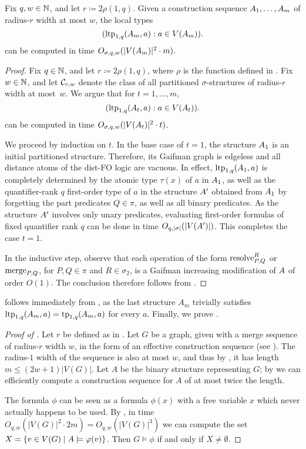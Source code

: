 \begin{lemma}\label{lem:compute}Fix $q,w\in\N$, and let $r\coloneqq 2\rho(1,q)$.
 Given a  construction sequence  $\str A_1,\ldots,\str A_m$
 of radius-$r$ width at most $w$, the local types 
   $$(\ltp_{1,q}(\str A_m,a):a\in V(\str A_m)).$$
 can be computed in time 
 $O_{\sigma,q,w}(|V(\str A_m)|^2 \cdot m)$.
\end{lemma}
\begin{proof}
  Fix $q\in\N$,
and let $r\coloneqq 2\rho(1,q)$, where $\rho$ is the function defined in .
Fix $w\in\N$, and let $\CC_{r,w}$ denote the class of all partitioned $\sigma$-structures 
of radius-$r$ width at most~$w$.
We argue that for $t=1,\ldots,m$,
$$(\ltp_{1,q}(\str A_t,a):a\in V(\str A_t)).$$
can be computed in time 
$O_{\sigma,q,w}(|V(\str A_t)|^2\cdot t)$.

We proceed by induction on $t$.
In the base case of $t=1$, the structure $\str A_1$ is an initial partitioned structure.
  Therefore, its Gaifman graph is edgeless and all distance atoms of the dist-FO logic are vacuous.
  In effect, $\ltp_{1,q}(\str A_1,a)$ is completely determined by the 
  atomic type $\tau(x)$ of $a$ in $\str A_1$,
as well as the  quantifier-rank $q$ first-order type of $a$ in the structure $\str A'$ obtained from $\str A_1$ by forgetting the part predicates $Q\in\pi$, as well as all binary predicates. As the structure $\str A'$ involves only unary predicates, 
evaluating first-order formulas of fixed quantifier rank $q$ can be done in time $O_{q,|\sigma|}(|V(\str A')|)$.
This completes the case $t=1$.

In the inductive step,
observe 
that 
each operation of the form 
$\resolve RPQ$ or $\merge PQ$, for $P,Q\in \pi$ and $R\in\sigma_2$,
is a Gaifman increasing modification of $\str A$ of order $O(1)$.
The conclusion therefore follows from .
\end{proof}

 follows immediately from ,
as the last structure \(A_m\) trivially satisfies \(\ltp_{1,q}(A_m,a)=\tp_{1,q}(A_m,a)\) for every \(a\).
Finally, we prove .

\begin{proof}[Proof of ]
  Let $r$ be defined as in .
  Let  $G$ be a graph, given with a merge sequence of radius-$r$ width $w$, in the form of an effective construction sequence (see ).
  The radius-$1$ width of the sequence is also at most $w$, and thus
  by , it has length \(m\le (2w+1)|V(G)|.\)
  Let $A$ be the binary structure representing $G$;
  by  we can efficiently compute a construction sequence for $A$ of at most twice the length.

The formula \(\phi\) can be seen as a formula \(\phi(x)\) with a free variable \(x\) which never actually happens to be used.
By , in time $O_{q,w}(|V(G)|^2 \cdot 2m) = O_{q,w}(|V(G)|^3)$ we can compute the set 
$X=\setof{v\in V(G)}{A\models \phi(v)}$.
Then $G\models\phi$ if and only if $X\neq \emptyset$.
\end{proof}



